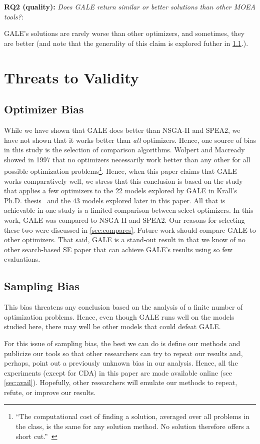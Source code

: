 \documentclass[10pt,journal,compsoc]{IEEEtran}
\newcommand{\tion}[1]{\textsection\ref{sec:#1}}
\begin{document}
{\bf RQ2 (quality):} {\em Does  GALE  return  similar or better solutions than other MOEA tools?}:

GALE's solutions are rarely worse than other optimizers, and sometimes, they are 
better (and note that the generality of this claim is explored futher in \tion{ob}.).


\section{Threats to Validity}


\subsection{Optimizer Bias}\label{sec:ob}
While we have shown that GALE does better than NSGA-II and SPEA2, we have not shown
that it works better than {\em all} optimizers. Hence, one source of bias in this
study is the selection of comparison algorithms.
Wolpert and Macready~\cite{wolpert97} showed in 1997
that no optimizers necessarily work better than any
other for all possible optimization
problems\footnote{``The computational
  cost of finding a solution, averaged over all
  problems in the class, is the same for any
  solution method.  No solution therefore offers a
  short cut.''~\cite{wolpert97}}. Hence, when this paper claims that
GALE works comparatively well, we  stress that this conclusion 
is based on the study that applies a few optimizers to the
22 models explored by GALE in Krall's Ph.D. thesis~\cite{krall14f}
and the 43 models explored later in this paper.
All that is achievable in one study is a limited comparison between select optimizers. 
In this work, GALE was compared to 
NSGA-II and SPEA2. Our reasons for
selecting these two were discussed in
\tion{compares}.  Future work should compare GALE to other optimizers.
That said, GALE is a stand-out result in that we know of no other search-based
SE paper that can achieve GALE's results using so few evaluations.




\subsection{ Sampling Bias}
This bias threatens any conclusion based on the
analysis of a finite number of optimization
problems.  Hence, even though GALE runs well on
the models studied here, there may well be other
models that could defeat GALE.  

For this issue of sampling bias, the best we can do
is define our methods and publicize our tools so
that other researchers can try to repeat our results
and, perhaps, point out a previously unknown bias in
our analysis. Hence, all the experiments (except for
CDA) in this paper are made available online (see \tion{avail}).  Hopefully, other
researchers will emulate our methods to repeat,
refute, or improve our results.
\end{document}
